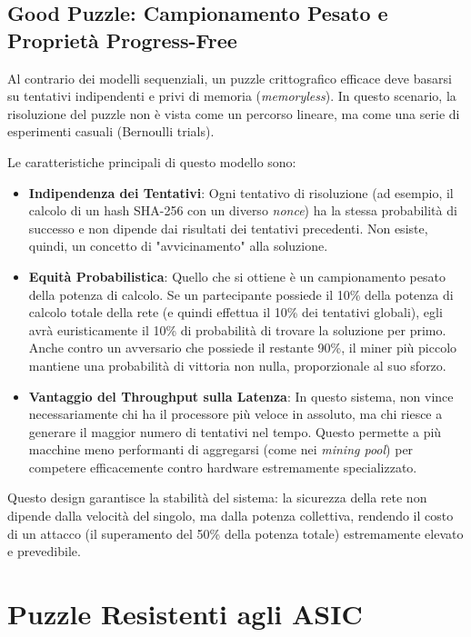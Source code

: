 \subsection{Good Puzzle: Campionamento Pesato e Proprietà Progress-Free}

Al contrario dei modelli sequenziali, un puzzle crittografico efficace deve basarsi su tentativi indipendenti e privi di memoria (\textit{memoryless}). In questo scenario, la risoluzione del puzzle non è vista come un percorso lineare, ma come una serie di esperimenti casuali (Bernoulli trials).

Le caratteristiche principali di questo modello sono:

\begin{itemize}
    \item \textbf{Indipendenza dei Tentativi}: Ogni tentativo di risoluzione (ad esempio, il calcolo di un hash SHA-256 con un diverso \textit{nonce}) ha la stessa probabilità di successo e non dipende dai risultati dei tentativi precedenti. Non esiste, quindi, un concetto di "avvicinamento" alla soluzione.
    
    \item \textbf{Equità Probabilistica}: Quello che si ottiene è un campionamento pesato della potenza di calcolo. Se un partecipante possiede il 10\% della potenza di calcolo totale della rete (e quindi effettua il 10\% dei tentativi globali), egli avrà euristicamente il 10\% di probabilità di trovare la soluzione per primo. Anche contro un avversario che possiede il restante 90\%, il miner più piccolo mantiene una probabilità di vittoria non nulla, proporzionale al suo sforzo.
    
    \item \textbf{Vantaggio del Throughput sulla Latenza}: In questo sistema, non vince necessariamente chi ha il processore più veloce in assoluto, ma chi riesce a generare il maggior numero di tentativi nel tempo. Questo permette a più macchine meno performanti di aggregarsi (come nei \textit{mining pool}) per competere efficacemente contro hardware estremamente specializzato.
\end{itemize}
Questo design garantisce la stabilità del sistema: la sicurezza della rete non dipende dalla velocità del singolo, ma dalla potenza collettiva, rendendo il costo di un attacco (il superamento del 50\% della potenza totale) estremamente elevato e prevedibile.

\section{Puzzle Resistenti agli ASIC}

